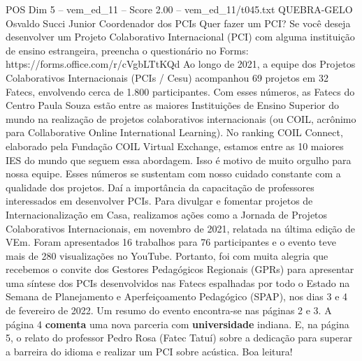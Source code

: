 \begin{textsample}{POS Dim 5 – vem\_ed\_11 – Score 2.00 – vem\_ed\_11/t045.txt}  \label{ex:f5_pos_114}
QUEBRA-GELO Osvaldo Succi Junior Coordenador dos PCIs Quer fazer um PCI?
Se você deseja desenvolver um Projeto Colaborativo Internacional (PCI) com alguma instituição de ensino estrangeira, preencha o questionário no Forms: https://forms.office.com/r/cVgbLTtKQd Ao longo de 2021, a equipe dos Projetos Colaborativos Internacionais (PCIs / Cesu) acompanhou 69 projetos em 32 Fatecs, envolvendo cerca de 1.800 participantes.
Com esses números, as Fatecs do Centro Paula Souza estão entre as maiores Instituições de Ensino Superior do mundo na realização de projetos colaborativos internacionais (ou COIL, acrônimo para Collaborative Online International Learning).
No ranking COIL Connect, elaborado pela Fundação COIL Virtual Exchange, estamos entre as 10 maiores IES do mundo que seguem essa abordagem.
Isso é motivo de muito orgulho para nossa equipe.
Esses números se sustentam com nosso cuidado constante com a qualidade dos projetos.
Daí a importância da capacitação de professores interessados em desenvolver PCIs.
Para divulgar e fomentar projetos de Internacionalização em Casa, realizamos ações como a Jornada de Projetos Colaborativos Internacionais, em novembro de 2021, relatada na última edição de VEm.
Foram apresentados 16 trabalhos para 76 participantes e o evento teve mais de 280 visualizações no YouTube.
Portanto, foi com muita alegria que recebemos o convite dos Gestores Pedagógicos Regionais (GPRs) para apresentar uma síntese dos PCIs desenvolvidos nas Fatecs espalhadas por todo o Estado na Semana de Planejamento e Aperfeiçoamento Pedagógico (SPAP), nos dias 3 e 4 de fevereiro de 2022.
Um resumo do evento encontra-se nas páginas 2 e 3.
A página 4 \textbf{comenta} uma nova parceria com \textbf{universidade} indiana.
E, na página 5, o relato do professor Pedro Rosa (Fatec Tatuí) sobre a dedicação para superar a barreira do idioma e realizar um PCI sobre acústica.
Boa leitura!

\end{textsample}

